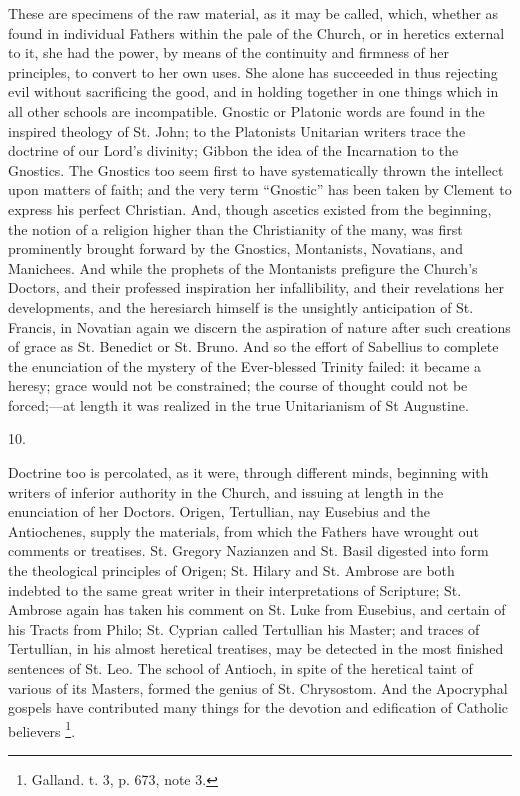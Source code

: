 These are specimens of the raw material, as it may be
called, which, whether as found in individual
Fathers within the pale of the Church, or in heretics
external to it, she had the power, by means of the
continuity and firmness of her principles, to convert to
her own uses. She alone has succeeded in thus rejecting
evil without sacrificing the good, and in holding
together in one things which in all other schools are
incompatible. Gnostic or Platonic words are found in the
inspired theology of St. John; to the Platonists
Unitarian writers trace the doctrine of our Lord's
divinity; Gibbon the idea of the Incarnation to the
Gnostics. The Gnostics too seem first to have
systematically thrown the intellect upon matters of
faith; and the very term ``Gnostic'' has been
taken by Clement to express his perfect Christian. And,
though ascetics existed from the beginning, the notion of
a religion higher than the Christianity of the many, was
first prominently brought forward by the Gnostics,
Montanists, Novatians, and Manichees. And while the
prophets of the Montanists prefigure the Church's
Doctors, and their professed inspiration her
infallibility, and their revelations her developments,
and the heresiarch himself is the unsightly anticipation
of St. Francis, in Novatian again we discern the
aspiration of nature after such creations of grace as St.
Benedict or St. Bruno. And so the effort of Sabellius to
complete the enunciation of the mystery of the
Ever-blessed Trinity failed: it became a heresy; grace
would not be constrained; the course of thought could not
be forced;—at length it was realized in the true
Unitarianism of St Augustine.

10.

Doctrine too is percolated, as it were, through
different minds, beginning with writers of inferior
authority in the Church, and issuing at length in the
enunciation of her Doctors. Origen, Tertullian, nay
Eusebius and the Antiochenes, supply the materials,
from which the Fathers have wrought out comments or
treatises. St. Gregory Nazianzen and St. Basil digested
into form the theological principles of Origen; St.
Hilary and St. Ambrose are both indebted to the same
great writer in their interpretations of Scripture; St.
Ambrose again has taken his comment on St. Luke from
Eusebius, and certain of his Tracts from Philo; St.
Cyprian called Tertullian his Master; and traces of
Tertullian, in his almost heretical treatises, may be
detected in the most finished sentences of St. Leo. The
school of Antioch, in spite of the heretical taint of
various of its Masters, formed the genius of St.
Chrysostom. And the Apocryphal gospels have contributed
many things for the devotion and edification of Catholic
believers \footnote{Galland. t. 3, p. 673, note 3.}.

